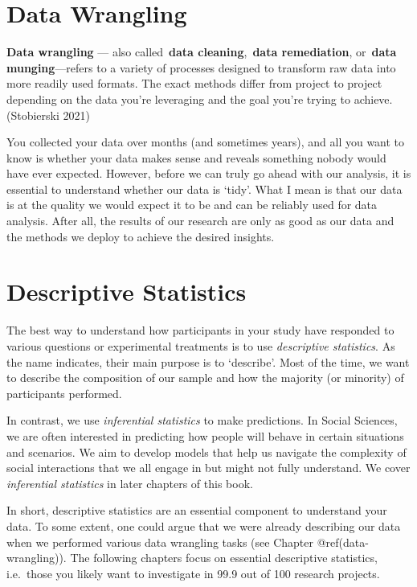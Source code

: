 \documentclass[
  letterpaper,
]{krantz}
\renewenvironment{quote}{\begin{VF}}{\end{VF}}
\begin{document}
\chapter{Data Wrangling}\label{data-wrangling}

\begin{quote}
\textbf{Data wrangling} --- also called~\textbf{data
cleaning},~\textbf{data remediation}, or~\textbf{data munging}---refers
to a variety of processes designed to transform raw data into more
readily used formats. The exact methods differ from project to project
depending on the data you're leveraging and the goal you're trying to
achieve. (Stobierski 2021)
\end{quote}

You collected your data over months (and sometimes years), and all you
want to know is whether your data makes sense and reveals something
nobody would have ever expected. However, before we can truly go ahead
with our analysis, it is essential to understand whether our data is
`tidy'. What I mean is that our data is at the quality we would expect
it to be and can be reliably used for data analysis. After all, the
results of our research are only as good as our data and the methods we
deploy to achieve the desired insights.


\chapter{Descriptive Statistics}\label{descriptive-statistics}

The best way to understand how participants in your study have responded
to various questions or experimental treatments is to use
\emph{descriptive statistics}. As the name indicates, their main purpose
is to `describe'. Most of the time, we want to describe the composition
of our sample and how the majority (or minority) of participants
performed.

In contrast, we use \emph{inferential statistics} to make predictions.
In Social Sciences, we are often interested in predicting how people
will behave in certain situations and scenarios. We aim to develop
models that help us navigate the complexity of social interactions that
we all engage in but might not fully understand. We cover
\emph{inferential statistics} in later chapters of this book.

In short, descriptive statistics are an essential component to
understand your data. To some extent, one could argue that we were
already describing our data when we performed various data wrangling
tasks (see Chapter @ref(data-wrangling)). The following chapters focus
on essential descriptive statistics, i.e.~those you likely want to
investigate in 99.9 out of 100 research projects.
\end{document}

